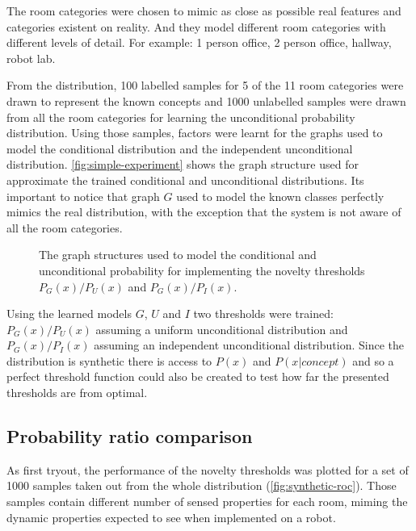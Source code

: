 \documentclass[runningheads,a4paper]{llncs}
\begin{document}
The room categories were chosen to mimic as close as possible real features and
categories existent on reality. And they model different room categories with
different levels of detail. For example: 1 person office, 2 person office, hallway,
robot lab.

From the distribution, 100 labelled samples for 5 of the 11 room categories were
drawn to represent the known concepts and 1000 unlabelled samples were drawn from
all the room categories for learning the unconditional probability distribution.
Using those samples, factors were learnt for the graphs used to model the
conditional distribution and the independent unconditional distribution.
\autoref{fig:simple-experiment} shows the graph structure used for approximate the
trained conditional and unconditional distributions.
Its important to notice that graph $G$ used to model the known classes perfectly
mimics the real distribution, with the exception that the system is not aware of
all the room categories.

\begin{figure}[h]
\centering

\qquad
{}
\qquad
{}

\caption{\label{fig:simple-experiment}The graph structures used to model the
         conditional and unconditional probability for implementing the novelty
         thresholds $P_G(x)/P_U(x)$ and $P_G(x)/P_I(x)$.}
\end{figure}

Using the learned models $G$, $U$ and $I$ two thresholds were trained:
$P_G(x)/P_U(x)$ assuming a uniform unconditional distribution
and $P_G(x)/P_I(x)$ assuming an independent unconditional distribution.
Since the distribution is synthetic there is access to $P(x)$ and $P(x|concept)$
and so a perfect threshold function could also be created to test how far the
presented thresholds are from optimal.

\subsection{Probability ratio comparison}
As first tryout, the performance of the novelty thresholds was plotted for a set
of 1000 samples taken out from the whole distribution (\autoref{fig:synthetic-roc}).
Those samples contain different number of sensed properties for each room, miming
the dynamic properties expected to see when implemented on a robot.
\end{document}
